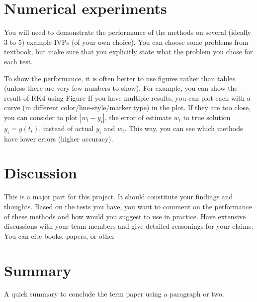 \documentclass[11pt]{article}	%
\begin{document}
\section{Numerical experiments}
You will need to demonstrate the performance
of the methods on several (ideally 3 to 5) example IVPs (of your own choice).
You can choose some problems from textbook, but make sure that you
explicitly state what the problem you chose for each test.

To show the performance, it is often better to use figures
rather than tables (unless there are very few numbers to show).
For example, you can show the result of RK4
using Figure If you have multiple results, you can plot each
with a curve (in different color/line-style/marker type) in the plot. If they are too close, you can consider to
plot $|w_i-y_i|$, the error of estimate $w_i$ to true solution $y_i=y(t_i)$,
instead of actual $y_i$ and $w_i$. This way, you can see which methods have lower errors (higher accuracy).

\section{Discussion}
This is a major part for this project. It should constitute your findings and thoughts.
Based on the tests you have,
you want to comment on the performance of these methods and how would you
suggest to use in practice. Have extensive discussions with your team members
and give detailed reasonings for your claims. You can cite books, papers, or other


\section{Summary}
A quick summary to conclude the term paper using a paragraph or two.
\end{document}
